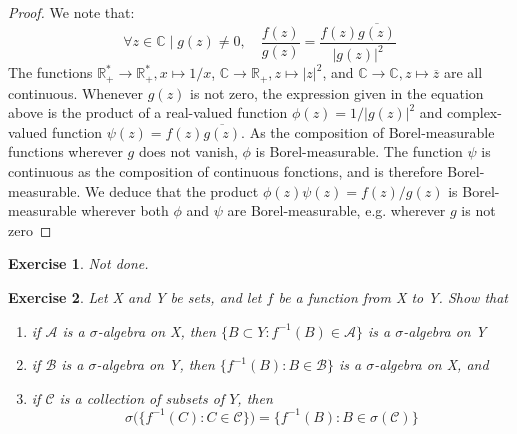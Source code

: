 \documentclass[11pt,a4paper,twoside]{article}
\newtheorem{exercise}{Exercise}
\begin{document}
\begin{proof}
  We note that:
  \begin{equation*}
    \forall z\in\mathbb{C}\mid g(z)\neq 0,\quad
    \frac{f(z)}{g(z)}=\frac{f(z)\overline{g(z)}}{|g(z)|^2}
  \end{equation*}
  The functions $\mathbb{R}_+^*\to\mathbb{R}_+^*, x\mapsto 1/x$,
  $\mathbb{C}\to\mathbb{R}_+, z\mapsto|z|^2$, and
  $\mathbb{C}\to\mathbb{C}, z\mapsto\overline{z}$ are all
  continuous. Whenever $g(z)$ is not zero, the expression given in the
  equation above is the product of a real-valued function
  $\phi(z)=1/|g(z)|^2$ and complex-valued function
  $\psi(z)=f(z)\overline{g(z)}$.
  As the composition of Borel-measurable functions wherever $g$ does
  not vanish, $\phi$ is Borel-measurable. The function $\psi$ is
  continuous as the composition of continuous fonctions, and is
  therefore Borel-measurable. We deduce that the product
  $\phi(z)\psi(z)=f(z)/g(z)$ is Borel-measurable wherever both $\phi$
  and $\psi$ are Borel-measurable, e.g. wherever $g$ is not zero
\end{proof}


\begin{exercise}
Not done.
\end{exercise}


\begin{exercise}
  Let X and Y be sets, and let $f$ be a function from X to Y. Show that
  \begin{enumerate}
  \item if $\mathscr{A}$ is a $\sigma$-algebra on X, then $\{B\subset
    Y:f^{-1}(B)\in\mathscr{A}\}$ is a $\sigma$-algebra on Y
  \item if $\mathscr{B}$ is a $\sigma$-algebra on Y, then
    $\{f^{-1}(B):B\in\mathscr{B}\}$ is a $\sigma$-algebra on X, and
  \item if $\mathscr{C}$ is a collection of subsets of $Y$, then
    \begin{equation*}
      \sigma\big(\{f^{-1}(C):C\in\mathscr{C}\}\big)=\{f^{-1}(B):B\in\sigma(\mathscr{C})\}
    \end{equation*}
  \end{enumerate}
\end{exercise}
\end{document}

